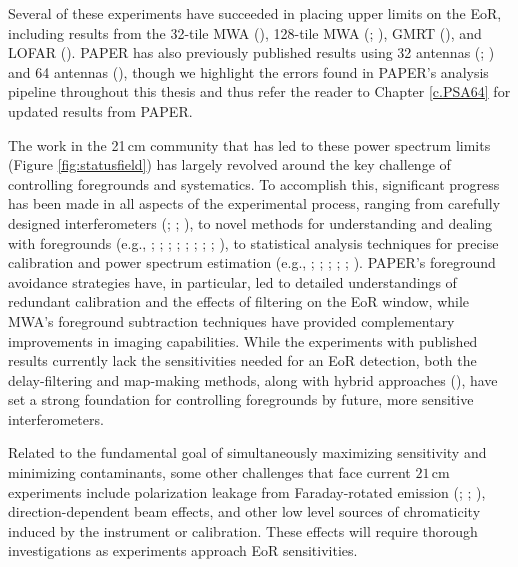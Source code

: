Several of these experiments have succeeded in placing upper limits on the EoR, including results from the 32-tile MWA (\citealt{dillon_et_al2014}), 128-tile MWA (\citealt{dillon_et_al2015}; \citealt{beardsley_et_al2016}), GMRT (\citealt{paciga_et_al2013}), and LOFAR (\citealt{patil_et_al2017}). PAPER has also previously published results using 32 antennas (\citealt{parsons_et_al2014}; \citealt{jacobs_et_al2015}) and 64 antennas (\citealt{ali_et_al2015}), though we highlight the errors found in PAPER's analysis pipeline throughout this thesis and thus refer the reader to Chapter \ref{c.PSA64} for updated results from PAPER.

The work in the 21\,cm community that has led to these power spectrum limits (Figure \ref{fig:statusfield}) has largely revolved around the key challenge of controlling foregrounds and systematics. To accomplish this, significant progress has been made in all aspects of the experimental process, ranging from carefully designed interferometers (\citealt{lonsdale_et_al2009}; \citealt{parsons_et_al2012a}; \citealt{dillon_parsons2016}), to novel methods for understanding and dealing with foregrounds (e.g., \citealt{morales_et_al2006}; \citealt{datta_et_al2010}; \citealt{sullivan_et_al2012}; \citealt{moore_et_al2013}; \citealt{hazelton_et_al2013}; \citealt{pober_et_al2013b}; \citealt{liu_et_al2014a}; \citealt{liu_et_al2014b}; \citealt{thyagarajan_et_al2015}), to statistical analysis techniques for precise calibration and power spectrum estimation (e.g., \citealt{liu_et_al2010}; \citealt{trott_et_al2012}; \citealt{liu_et_al2014b}; \citealt{zheng_et_al2014}; \citealt{dillon_et_al2014}; \citealt{jacobs_et_al2016}). PAPER's foreground avoidance strategies have, in particular, led to detailed understandings of redundant calibration and the effects of filtering on the EoR window, while MWA's foreground subtraction techniques have provided complementary improvements in imaging capabilities. While the experiments with published results currently lack the sensitivities needed for an EoR detection, both the delay-filtering and map-making methods, along with hybrid approaches (\citealt{trott_et_al2016}), have set a strong foundation for controlling foregrounds by future, more sensitive interferometers.

Related to the fundamental goal of simultaneously maximizing sensitivity and minimizing contaminants, some other challenges that face current $21$\,cm experiments include polarization leakage from Faraday-rotated emission (\citealt{moore_et_al2013}; \citealt{kohn_et_al2016}; \citealt{nunhokee_et_al2017}), direction-dependent beam effects, and other low level sources of chromaticity induced by the instrument or calibration. These effects will require thorough investigations as experiments approach EoR sensitivities.

